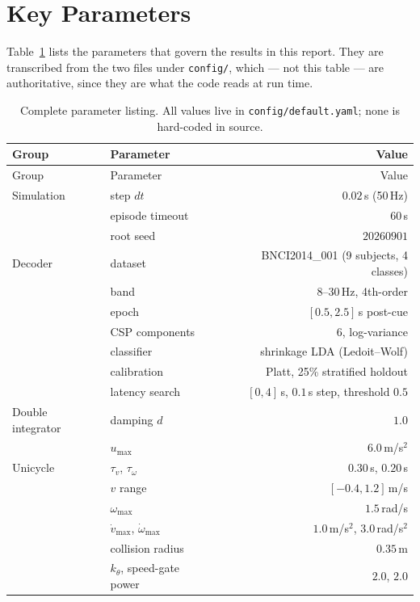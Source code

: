 \documentclass[11pt,a4paper]{article}
\theoremstyle{plain}
\theoremstyle{definition}
\begin{document}
\section{Key Parameters}

Table~\ref{tab:params} lists the parameters that govern the results in
this report. They are transcribed from the two files under
\texttt{config/}, which --- not this table --- are authoritative, since
they are what the code reads at run time.

\begin{longtable}{@{}llr@{}}
\caption{Complete parameter listing. All values live in
\texttt{config/default.yaml}; none is hard-coded in source.}
\label{tab:params}\\
\toprule
Group & Parameter & Value \\
\midrule
\endfirsthead
\toprule
Group & Parameter & Value \\
\midrule
\endhead
Simulation & step $dt$ & $0.02$\,s (50\,Hz) \\
           & episode timeout & $60$\,s \\
           & root seed & $20260901$ \\
\midrule
Decoder & dataset & BNCI2014\_001 (9 subjects, 4 classes) \\
        & band & $8$--$30$\,Hz, 4th-order \\
        & epoch & $[0.5, 2.5]$\,s post-cue \\
        & CSP components & 6, log-variance \\
        & classifier & shrinkage LDA (Ledoit--Wolf) \\
        & calibration & Platt, 25\% stratified holdout \\
        & latency search & $[0, 4]$\,s, $0.1$\,s step, threshold $0.5$ \\
\midrule
Double integrator & damping $d$ & $1.0$ \\
        & $u_{\max}$ & $6.0$\,m/s$^2$ \\
\midrule
Unicycle & $\tau_v$, $\tau_\omega$ & $0.30$\,s, $0.20$\,s \\
         & $v$ range & $[-0.4, 1.2]$\,m/s \\
         & $\omega_{\max}$ & $1.5$\,rad/s \\
         & $\dot v_{\max}$, $\dot\omega_{\max}$ & $1.0$\,m/s$^2$, $3.0$\,rad/s$^2$ \\
         & collision radius & $0.35$\,m \\
         & $k_\theta$, speed-gate power & $2.0$, $2.0$ \\

\end{longtable}
\end{document}
